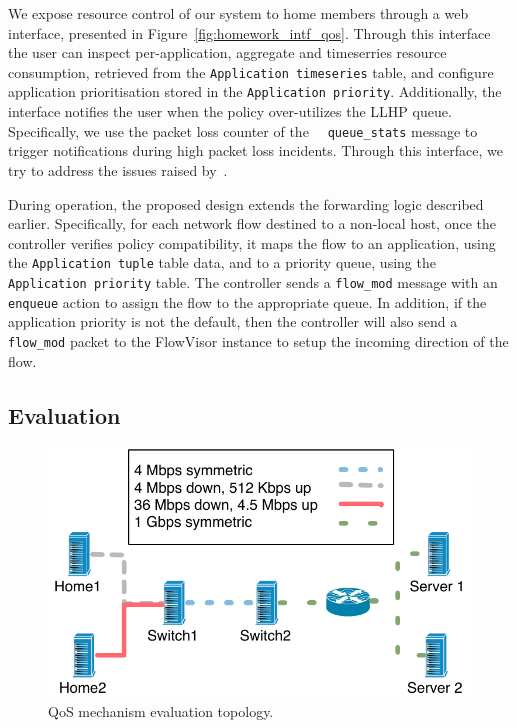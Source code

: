 We expose resource control of our system to home members through a web interface,
presented in Figure~\ref{fig:homework_intf_qos}.  Through this interface the
user can inspect per-application, aggregate and timeserries resource consumption,
retrieved from the \texttt{Application timeseries} table, and configure
application prioritisation stored in the \texttt{Application priority}.
Additionally, the interface notifies the user when the policy over-utilizes the
LLHP queue.  Specifically, we use the packet loss counter of the \of~{\tt
  queue\_stats} message to trigger notifications during high packet loss
incidents.  Through this interface, we try to address the issues raised
by~. 

During operation, the proposed design extends the forwarding logic described
earlier. Specifically, for each network flow destined to a non-local host, once
the controller verifies policy compatibility, it maps the flow to an
application, using the \texttt{Application tuple} table data,  and to a priority
queue, using the \texttt{Application priority} table. The controller sends a
{\tt flow\_mod} message with an {\tt enqueue} action to assign the flow to the
appropriate queue. In addition, if the application priority is not the default,
then the controller will also send a {\tt flow\_mod} packet to the FlowVisor
instance to setup the incoming direction of the flow. 

\subsection{Evaluation} \label{s:qos:eval}

\begin{figure}
  \centering
  \includegraphics[width=0.6\columnwidth]{queue_eval_setup}
  \caption{\label{fig:queue_eval_setup} QoS mechanism evaluation topology.}
\end{figure}

